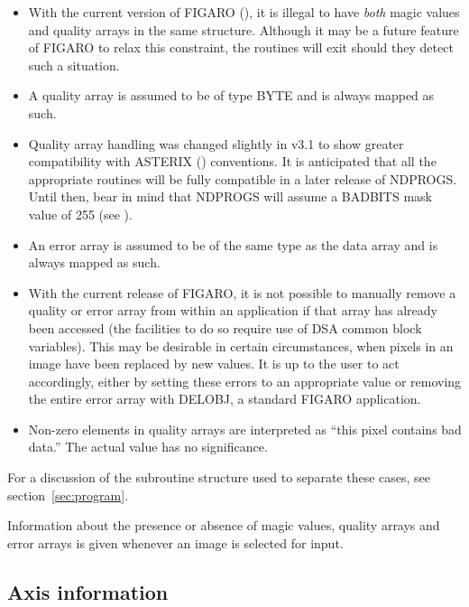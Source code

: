 \begin{itemize}

\item With the current version of FIGARO (),
it is illegal to have {\em
both} magic values and quality arrays in the same structure. Although
it may be a future feature of FIGARO to relax this constraint, the
routines will exit should they detect such a situation.

\item A quality array is assumed to be of type BYTE and is always
mapped as such.

\item Quality array handling was changed slightly in v3.1 to show
greater compatibility with ASTERIX () conventions. It is anticipated that
all the appropriate routines will be fully compatible in a later
release of NDPROGS.  Until then, bear in mind that NDPROGS will assume
a BADBITS mask value of 255 (see ).

\item An error array is assumed to be of the same type as the data
array and is always mapped as such.

\item With the current release of FIGARO, it is not possible to
manually remove a quality or error array from within an application if
that array has already been accessed (the facilities to do so require
use of DSA common block variables). This may be desirable in certain
circumstances, when pixels in an image have been replaced by new
values.  It is up to the user to act accordingly, either by setting
these errors to an appropriate value or removing the entire error array
with DELOBJ, a standard FIGARO application.

\item Non-zero elements in quality arrays are interpreted as ``this
pixel contains bad data.'' The actual value has no significance.

\end{itemize}

For a discussion of the subroutine structure used to separate these
cases, see section~\ref{sec:program}.

Information about the presence or absence of magic values, quality
arrays and error arrays is given whenever an image is selected for
input.

\subsection{Axis information}

